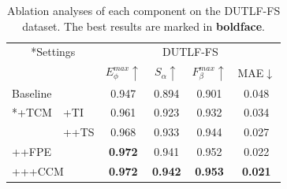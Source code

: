 % 
%
\begin{table}
	\caption{Ablation analyses of each component on the DUTLF-FS dataset.
		The best results are marked in \textbf{boldface}.
	}
	\centering
	\label{table:abl_total}
		\begin{tabular}{llcccc}
			\toprule  %
			
			\multicolumn{2}{c}{ \multirow{2}*{Settings}}	& \multicolumn{4}{c}{DUTLF-FS} \\ %
			
			\cmidrule(r){3-6} 
			
			& & $E_{\phi}^{max}\uparrow$ & $S_{\alpha }\uparrow $ & $F_{\beta}^{max}\uparrow$ & MAE$\downarrow$ \\
			\midrule
			
			\multicolumn{2}{l}{ Baseline }     & 0.947 & 0.894 & 0.901 & 0.048 \\ 
			
			
			\midrule
			
			\multicolumn{1}{c}{ \multirow{2}*{+TCM}}	
			
			& +TI		& 0.961 & 0.923 & 0.932 & 0.034 \\ 
			& ++TS & 0.968 & 0.933 & 0.944 & 0.027 \\
			\midrule
			
			\multicolumn{2}{l}{++FPE} 		& \textbf{0.972} & 0.941 & 0.952 & 0.022 \\
			\multicolumn{2}{l}{+++CCM} 		& \textbf{0.972} & \textbf{0.942} & \textbf{0.953} & \textbf{0.021} \\ 
			
			
			\bottomrule
	\end{tabular}
\end{table}

